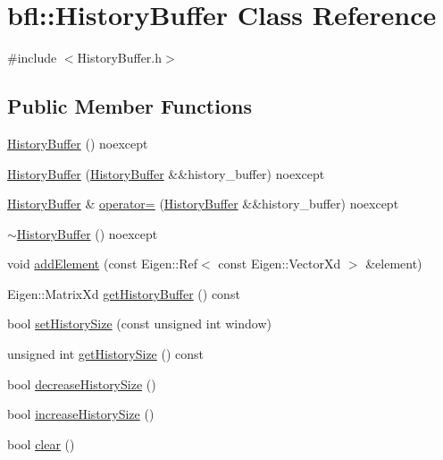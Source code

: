 \hypertarget{classbfl_1_1HistoryBuffer}{}\section{bfl\+:\+:History\+Buffer Class Reference}
\label{classbfl_1_1HistoryBuffer}


{\ttfamily \#include $<$History\+Buffer.\+h$>$}

\subsection*{Public Member Functions}
\begin{DoxyCompactItemize}
\item 
\mbox{\hyperlink{classbfl_1_1HistoryBuffer_a0b0c850ed4a50eeb7eb3d88e10937c1b}{History\+Buffer}} () noexcept
\item 
\mbox{\hyperlink{classbfl_1_1HistoryBuffer_ab88b9511d782060c1b3b0952f608cb08}{History\+Buffer}} (\mbox{\hyperlink{classbfl_1_1HistoryBuffer}{History\+Buffer}} \&\&history\+\_\+buffer) noexcept
\item 
\mbox{\hyperlink{classbfl_1_1HistoryBuffer}{History\+Buffer}} \& \mbox{\hyperlink{classbfl_1_1HistoryBuffer_a77a0d57c5413a374bf21d51693a81715}{operator=}} (\mbox{\hyperlink{classbfl_1_1HistoryBuffer}{History\+Buffer}} \&\&history\+\_\+buffer) noexcept
\item 
\mbox{\hyperlink{classbfl_1_1HistoryBuffer_af61bc43a22241a71223dbc1223480d90}{$\sim$\+History\+Buffer}} () noexcept
\item 
void \mbox{\hyperlink{classbfl_1_1HistoryBuffer_ae48829f91c14283fe403f34461c7e359}{add\+Element}} (const Eigen\+::\+Ref$<$ const Eigen\+::\+Vector\+Xd $>$ \&element)
\item 
Eigen\+::\+Matrix\+Xd \mbox{\hyperlink{classbfl_1_1HistoryBuffer_a30d73c7a82d817122a4b5329e6b042e4}{get\+History\+Buffer}} () const
\item 
bool \mbox{\hyperlink{classbfl_1_1HistoryBuffer_a34bc31abe55f9d43575919a15a1f90c3}{set\+History\+Size}} (const unsigned int window)
\item 
unsigned int \mbox{\hyperlink{classbfl_1_1HistoryBuffer_a0fef292d6e577b8f2f7d2035927edddb}{get\+History\+Size}} () const
\item 
bool \mbox{\hyperlink{classbfl_1_1HistoryBuffer_a3113fb73683eb5001e7fef0c6d3806cb}{decrease\+History\+Size}} ()
\item 
bool \mbox{\hyperlink{classbfl_1_1HistoryBuffer_a495d4786a46ffe6da00179f412d44f93}{increase\+History\+Size}} ()
\item 
bool \mbox{\hyperlink{classbfl_1_1HistoryBuffer_ad9d3d44d796dccc5adb22be9594618c8}{clear}} ()
\end{DoxyCompactItemize}
